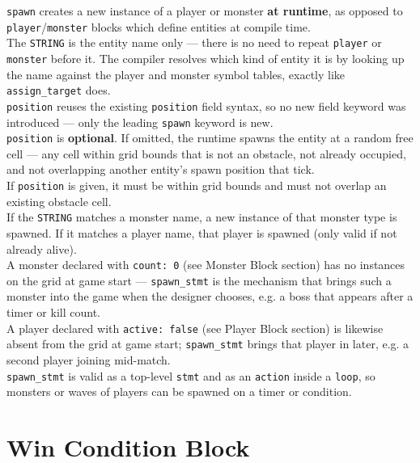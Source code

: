 \documentclass[12pt,a4paper]{article}
\begin{document}
\begin{cbox}
\texttt{spawn} creates a new instance of a player or monster \textbf{at runtime},
as opposed to \texttt{player}/\texttt{monster} blocks which define entities at
compile time.\\
The \texttt{STRING} is the entity name only --- there is no need to repeat
\texttt{player} or \texttt{monster} before it. The compiler resolves which
kind of entity it is by looking up the name against the player and monster
symbol tables, exactly like \texttt{assign\_target} does.\\
\texttt{position} reuses the existing \texttt{position} field syntax, so no
new field keyword was introduced --- only the leading \texttt{spawn} keyword
is new.\\
\texttt{position} is \textbf{optional}. If omitted, the runtime spawns the
entity at a random free cell --- any cell within grid bounds that is not
an obstacle, not already occupied, and not overlapping another entity's
spawn position that tick.\\
If \texttt{position} is given, it must be within grid bounds and must not
overlap an existing obstacle cell.\\
If the \texttt{STRING} matches a monster name, a new instance of that
monster type is spawned. If it matches a player name, that player is
spawned (only valid if not already alive).\\
A monster declared with \texttt{count: 0} (see Monster Block section)
has no instances on the grid at game start --- \texttt{spawn\_stmt} is
the mechanism that brings such a monster into the game when the
designer chooses, e.g. a boss that appears after a timer or kill count.\\
A player declared with \texttt{active: false} (see Player Block section)
is likewise absent from the grid at game start; \texttt{spawn\_stmt} brings
that player in later, e.g. a second player joining mid-match.\\
\texttt{spawn\_stmt} is valid as a top-level \texttt{stmt} and as an
\texttt{action} inside a \texttt{loop}, so monsters or waves of players
can be spawned on a timer or condition.
\end{cbox}

\section{Win Condition Block}
\end{document}
